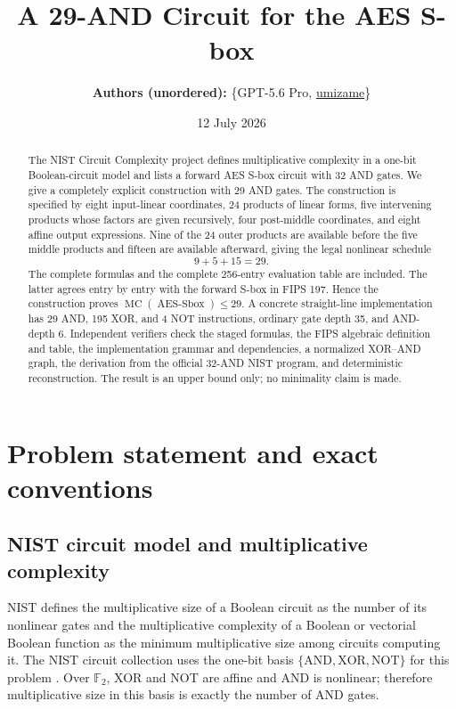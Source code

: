 \documentclass[11pt]{article}
\title{\bfseries A 29-AND Circuit for the AES S-box}
\author{\textbf{Authors (unordered):} \{GPT-5.6 Pro, \href{https://github.com/umizame}{umizame}\}}
\date{12 July 2026}
\theoremstyle{definition}
\newcommand{\F}{\mathbb F}
\newcommand{\AES}{\operatorname{AES\mbox{-}Sbox}}
\newcommand{\MC}{\operatorname{MC}}
\begin{document}
\maketitle

\begin{abstract}
The NIST Circuit Complexity project defines multiplicative complexity in a one-bit Boolean-circuit
model and lists a forward AES S-box circuit with 32 AND gates.  We give a completely explicit
construction with 29 AND gates.  The construction is specified by eight input-linear coordinates,
24 products of linear forms, five intervening products whose factors are given recursively, four
post-middle coordinates, and eight affine output expressions.  Nine of the 24 outer products are
available before the five middle products and fifteen are available afterward, giving the legal
nonlinear schedule
\[
  9+5+15=29.
\]
The complete formulas and the complete 256-entry evaluation table are included.  The latter agrees
entry by entry with the forward S-box in FIPS 197.  Hence the construction proves
\(
  \MC(\AES)\leq 29.
\)
A concrete straight-line implementation has 29 AND, 195 XOR, and 4 NOT instructions, ordinary gate
depth 35, and AND-depth 6.  Independent verifiers check the staged formulas, the FIPS algebraic
definition and table, the implementation grammar and dependencies, a normalized XOR--AND graph,
the derivation from the official 32-AND NIST program, and deterministic reconstruction.  The result
is an upper bound only; no minimality claim is made.
\end{abstract}

\tableofcontents
\bigskip

\section{Problem statement and exact conventions}
\label{sec:problem}

\subsection{NIST circuit model and multiplicative complexity}

NIST defines the multiplicative size of a Boolean circuit as the number of its nonlinear gates and
the multiplicative complexity of a Boolean or vectorial Boolean function as the minimum
multiplicative size among circuits computing it.  The NIST circuit collection uses the one-bit basis
\(\{\mathrm{AND},\mathrm{XOR},\mathrm{NOT}\}\) for this problem
\cite{nistCircuitComplexity}.  Over \(\F_2\), XOR and NOT are affine and AND is nonlinear; therefore
multiplicative size in this basis is exactly the number of AND gates.
\end{document}
